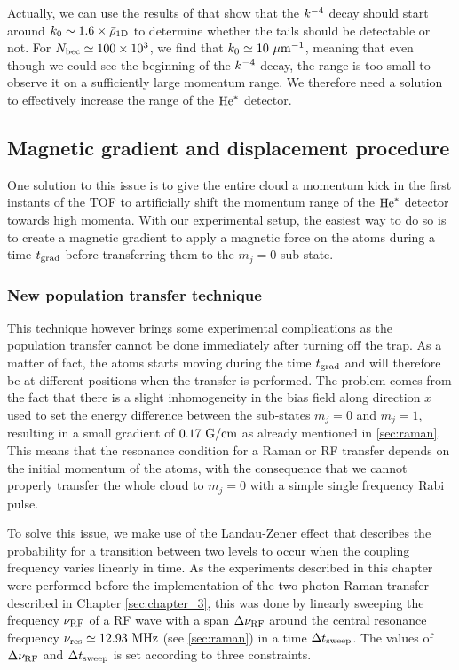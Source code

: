 Actually, we can use the results of \cite{xu2015universal} that show that the $k^{-4}$ decay should start around $k_0 \sim 1.6 \times \bar{\rho}_{\rm{1D}}$ to determine whether the tails should be detectable or not. For $N_{\rm{bec}} \simeq 100 \times 10^3$, we find that $k_0 \simeq 10 \ \mu \rm{m}^{-1}$, meaning that even though we could see the beginning of the $k^{-4}$ decay, the range is too small to observe it on a sufficiently large momentum range. We therefore need a solution to effectively increase the range of the $\mathrm{He}^*$ detector.

\subsection{Magnetic gradient and displacement procedure}

One solution to this issue is to give the entire cloud a momentum kick in the first instants of the TOF to artificially shift the momentum range of the $\mathrm{He}^*$ detector towards high momenta. With our experimental setup, the easiest way to do so is to create a magnetic gradient to apply a magnetic force on the atoms during a time $t_{\rm{grad}}$ before transferring them to the $m_j=0$ sub-state. 

\subsubsection{New population transfer technique}

This technique however brings some experimental complications as the population transfer cannot be done immediately after turning off the trap. As a matter of fact, the atoms starts moving during the time $t_{\rm{grad}}$ and will therefore be at different positions when the transfer is performed. The problem comes from the fact that there is a slight inhomogeneity in the bias field along direction $x$ used to set the energy difference between the sub-states $m_j=0$ and $m_j=1$, resulting in a small gradient of $0.17 \ \rm{G/cm}$ as already mentioned in \ref{sec:raman}. This means that the resonance condition for a Raman or RF transfer depends on the initial momentum of the atoms, with the consequence that we cannot properly transfer the whole cloud to $m_j=0$ with a simple single frequency Rabi pulse.

To solve this issue, we make use of the Landau-Zener effect that describes the probability for a transition between two levels to occur when the coupling frequency varies linearly in time. As the experiments described in this chapter were performed before the implementation of the two-photon Raman transfer described in Chapter \ref{sec:chapter_3}, this was done by linearly sweeping the frequency $\nu_{\rm{RF}}$ of a RF wave with a span $\Delta \nu_{\rm{RF}}$ around the central resonance frequency $\nu_{\rm{res}} \simeq 12.93 \ \rm{MHz}$ (see \ref{sec:raman}) in a time $\Delta t_{\rm{sweep}}$. The values of $\Delta \nu_{\rm{RF}}$ and $\Delta t_{\rm{sweep}}$ is set according to three constraints.

